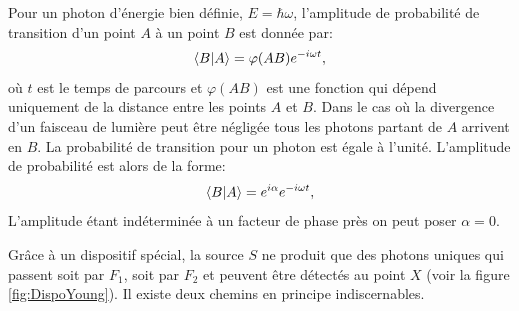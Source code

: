 Pour un photon d'énergie bien définie, $E=\hbar\omega$, l'amplitude de
probabilité de transition d'un point $A$ à un point $B$ est donnée par:%
\begin{equation}
\langle B\ket{A}=\varphi(AB)e^{-i\omega t},
\label{eq:AmplAB}%
\end{equation}
où $t$ est le temps de parcours et $\varphi(AB)$ est une fonction qui dépend
uniquement de la distance entre les points $A$ et $B$. Dans le cas où la
divergence d'un faisceau de lumière peut être négligée tous les photons
partant de $A$ arrivent en $B$. La probabilité de transition pour un photon
est égale à l'unité. L'amplitude de probabilité est alors de la forme:%
\begin{equation}
\langle B\vert A\rangle=e^{i\alpha}e^{-i\omega t},
\end{equation}
L'amplitude étant indéterminée à un facteur de phase près on peut poser
$\alpha=0$.

Grâce à un dispositif spécial, la source $S$ ne produit que des photons
uniques qui passent soit par $F_1$, soit par $F_2$ et peuvent être
détectés au point $X$ (voir la figure \ref{fig:DispoYoung}). Il existe deux
chemins en principe indiscernables.

